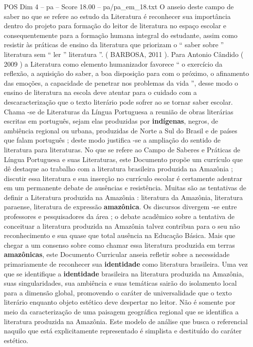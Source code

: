 \begin{textsample}{POS Dim 4 – pa – Score 18.00 – pa/pa\_em\_18.txt}
O anseio deste campo de saber no que se refere ao estudo da Literatura é reconhecer sua importância dentro do projeto para formação do leitor de literatura no espaço escolar e consequentemente para a formação humana integral do estudante, assim como resistir às práticas de ensino da literatura que priorizam o “ saber sobre ” literatura sem “ ler ” literatura ”. ( BARBOSA, 2011 ).
Para Antonio Cândido ( 2009 ) a Literatura como elemento humanizador favorece “ o exercício da reflexão, a aquisição do saber, a boa disposição para com o próximo, o afinamento das emoções, a capacidade de penetrar nos problemas da vida ”, desse modo o ensino de literatura na escola deve atentar para o cuidado com a descaracterização que o texto literário pode sofrer ao se tornar saber escolar.
Chama -se de Literaturas da Língua Portuguesa a reunião de obras literárias escritas em português, sejam elas produzidas por \textbf{indígenas}, negros, de ambiência regional ou urbana, produzidas de Norte a Sul do Brasil e de países que falam português ; deste modo justifica -se a ampliação do sentido de literatura para literaturas.
No que se refere ao Campo de Saberes e Práticas de Língua Portuguesa e suas Literaturas, este Documento propõe um currículo que dê destaque ao trabalho com a literatura brasileira produzida na Amazônia ; discutir essa literatura e sua inserção no currículo escolar é certamente adentrar em um permanente debate de ausências e resistência.
Muitas são as tentativas de definir a Literatura produzida na Amazônia : literatura da Amazônia, literatura paraense, literatura de expressão \textbf{amazônica}.
Os discursos divergem -se entre professores e pesquisadores da área ; o debate acadêmico sobre a tentativa de conceituar a literatura produzida na Amazônia talvez contribua para o seu não reconhecimento e sua quase que total ausência na Educação Básica.
Mais que chegar a um consenso sobre como chamar essa literatura produzida em terras \textbf{amazônicas}, este Documento Curricular anseia refletir sobre a necessidade primariamente de reconhecer sua \textbf{identidade} como literatura brasileira.
Uma vez que se identifique a \textbf{identidade} brasileira na literatura produzida na Amazônia, suas singularidades, sua ambiência e suas temáticas sairão do isolamento local para a dimensão global, promovendo o caráter de universalidade que o texto literário enquanto objeto estético deve despertar no leitor.
Não é somente por meio da caracterização de uma paisagem geográfica regional que se identifica a literatura produzida na Amazônia.
Este modelo de análise que busca o referencial naquilo que está explicitamente representado é simplista e destituído do caráter estético.

\end{textsample}

